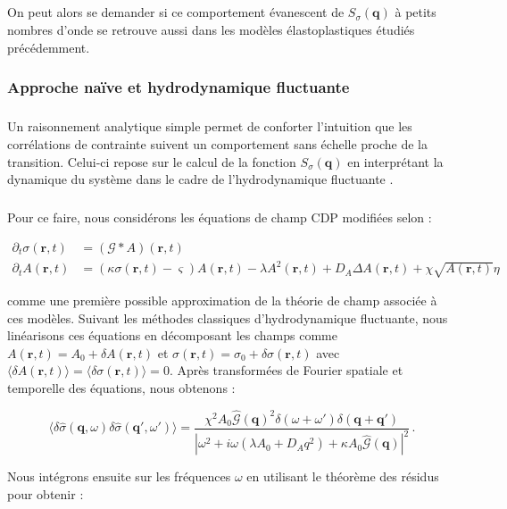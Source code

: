 \subparagraph{}On peut alors se demander si ce comportement évanescent de $S_\sigma(\mathbf{q})$ à petits nombres d'onde se retrouve aussi dans les modèles élastoplastiques étudiés précédemment.

\subsubsection{Approche naïve et hydrodynamique fluctuante}

\subparagraph{}Un raisonnement analytique simple permet de conforter l'intuition que les corrélations de contrainte suivent un comportement sans échelle proche de la transition. Celui-ci repose sur le calcul de la fonction $S_\sigma(\mathbf{q})$ en interprétant la dynamique du système dans le cadre de l'hydrodynamique fluctuante \cite{chaikin_principles_1995}. 

\subparagraph{}Pour ce faire, nous considérons les équations de champ CDP modifiées selon :

\begin{equation}
    \begin{aligned}
        \partial_t\sigma(\mathbf{r}, t) &= \left(\mathcal{G}\ast A \right)(\mathbf{r}, t)\\
        \partial_t A(\mathbf{r}, t) &= (\kappa\sigma(\mathbf{r}, t)-\varsigma)A(\mathbf{r}, t)-\lambda A^2(\mathbf{r}, t) + D_A\Delta A(\mathbf{r}, t)
        +\chi \sqrt{A(\mathbf{r}, t)}\eta
    \end{aligned}
\end{equation}

\noindent comme une première possible approximation de la théorie de champ associée à ces modèles. Suivant les méthodes classiques d'hydrodynamique fluctuante, nous linéarisons ces équations en décomposant les champs comme $A(\bm{r}, t) = A_0 +\delta A(\bm{r}, t)$ et $\sigma(\bm{r}, t) = \sigma_0 +\delta \sigma(\bm{r}, t)$ avec $\langle\delta A(\bm{r}, t)\rangle = \langle \delta \sigma(\bm{r}, t)\rangle = 0 $. Après transformées de Fourier spatiale et temporelle des équations, nous obtenons :

\begin{equation}
    \langle\delta\hat{\sigma}(\bm{q}, \omega)\delta\hat{\sigma}(\bm{q}', \omega')\rangle = \frac{\chi^2 A_0 \hat{\mathcal{G}}(\bm{q})^2 \delta(\omega+\omega')\delta(\bm{q} + \bm{q}')}{|\omega^2 + i\omega (\lambda A_0 + D_A q^2) + \kappa A_0 \hat{\mathcal{G}}(\bm{q})|^2}\, .
\end{equation}

\noindent Nous intégrons ensuite sur les fréquences $\omega$ en utilisant le théorème des résidus pour obtenir :

